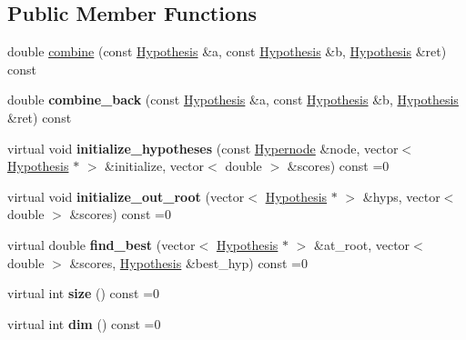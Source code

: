 \subsection*{Public Member Functions}
\begin{DoxyCompactItemize}
\item 
double \hyperlink{class_scarab_1_1_h_g_1_1_controller_a34cfe4b8e7496ffca1cedf64cb3f0a73}{combine} (const \hyperlink{struct_scarab_1_1_h_g_1_1_hypothesis}{Hypothesis} \&a, const \hyperlink{struct_scarab_1_1_h_g_1_1_hypothesis}{Hypothesis} \&b, \hyperlink{struct_scarab_1_1_h_g_1_1_hypothesis}{Hypothesis} \&ret) const 
\item 
\hypertarget{class_scarab_1_1_h_g_1_1_controller_a4b596f04765ad11b691e29383f5fbc3b}{
double {\bfseries combine\_\-back} (const \hyperlink{struct_scarab_1_1_h_g_1_1_hypothesis}{Hypothesis} \&a, const \hyperlink{struct_scarab_1_1_h_g_1_1_hypothesis}{Hypothesis} \&b, \hyperlink{struct_scarab_1_1_h_g_1_1_hypothesis}{Hypothesis} \&ret) const }
\label{class_scarab_1_1_h_g_1_1_controller_a4b596f04765ad11b691e29383f5fbc3b}

\item 
\hypertarget{class_scarab_1_1_h_g_1_1_controller_a5019e9591e6d4e5e29eb4ca6ac42d056}{
virtual void {\bfseries initialize\_\-hypotheses} (const \hyperlink{class_scarab_1_1_h_g_1_1_hypernode}{Hypernode} \&node, vector$<$ \hyperlink{struct_scarab_1_1_h_g_1_1_hypothesis}{Hypothesis} $\ast$ $>$ \&initialize, vector$<$ double $>$ \&scores) const =0}
\label{class_scarab_1_1_h_g_1_1_controller_a5019e9591e6d4e5e29eb4ca6ac42d056}

\item 
\hypertarget{class_scarab_1_1_h_g_1_1_controller_a34e4f087d77d06ee27fff2d3a8435473}{
virtual void {\bfseries initialize\_\-out\_\-root} (vector$<$ \hyperlink{struct_scarab_1_1_h_g_1_1_hypothesis}{Hypothesis} $\ast$ $>$ \&hyps, vector$<$ double $>$ \&scores) const =0}
\label{class_scarab_1_1_h_g_1_1_controller_a34e4f087d77d06ee27fff2d3a8435473}

\item 
\hypertarget{class_scarab_1_1_h_g_1_1_controller_ac4a38bf968379d3dc3f2b95cffabf540}{
virtual double {\bfseries find\_\-best} (vector$<$ \hyperlink{struct_scarab_1_1_h_g_1_1_hypothesis}{Hypothesis} $\ast$ $>$ \&at\_\-root, vector$<$ double $>$ \&scores, \hyperlink{struct_scarab_1_1_h_g_1_1_hypothesis}{Hypothesis} \&best\_\-hyp) const =0}
\label{class_scarab_1_1_h_g_1_1_controller_ac4a38bf968379d3dc3f2b95cffabf540}

\item 
\hypertarget{class_scarab_1_1_h_g_1_1_controller_a3498a09d093e6c6ed993e309db51480a}{
virtual int {\bfseries size} () const =0}
\label{class_scarab_1_1_h_g_1_1_controller_a3498a09d093e6c6ed993e309db51480a}

\item 
\hypertarget{class_scarab_1_1_h_g_1_1_controller_ab4282178c6b8d3670134ab0519eda518}{
virtual int {\bfseries dim} () const =0}
\label{class_scarab_1_1_h_g_1_1_controller_ab4282178c6b8d3670134ab0519eda518}

\end{DoxyCompactItemize}


